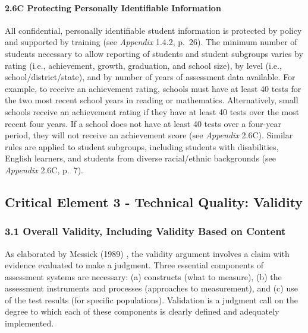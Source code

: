 \documentclass[]{article}
\let\oldparagraph\paragraph
\renewcommand{\paragraph}[1]{\oldparagraph{#1}\mbox{}}
\begin{document}
\paragraph{2.6C Protecting Personally Identifiable
Information}\label{c-protecting-personally-identifiable-information}

All confidential, personally identifiable student information is
protected by policy and supported by training (see \emph{Appendix}
1.4.2, p.~26). The minimum number of students necessary to allow
reporting of students and student subgroups varies by rating (i.e.,
achievement, growth, graduation, and school size), by level (i.e.,
school/district/state), and by number of years of assessment data
available. For example, to receive an achievement rating, schools must
have at least 40 tests for the two most recent school years in reading
or mathematics. Alternatively, small schools receive an achievement
rating if they have at least 40 tests over the most recent four years.
If a school does not have at least 40 tests over a four-year period,
they will not receive an achievement score (see \emph{Appendix} 2.6C).
Similar rules are applied to student subgroups, including students with
disabilities, English learners, and students from diverse racial/ethnic
backgrounds (see \emph{Appendix} 2.6C, p.~7).

\subsection{Critical Element 3 - Technical Quality:
Validity}\label{critical-element-3---technical-quality-validity}

\subsubsection{3.1 Overall Validity, Including Validity Based on
Content}\label{overall-validity-including-validity-based-on-content}

As elaborated by Messick (1989) , the validity argument involves a claim
with evidence evaluated to make a judgment. Three essential components
of assessment systems are necessary: (a) constructs (what to measure),
(b) the assessment instruments and processes (approaches to
measurement), and (c) use of the test results (for specific
populations). Validation is a judgment call on the degree to which each
of these components is clearly defined and adequately implemented.
\end{document}
